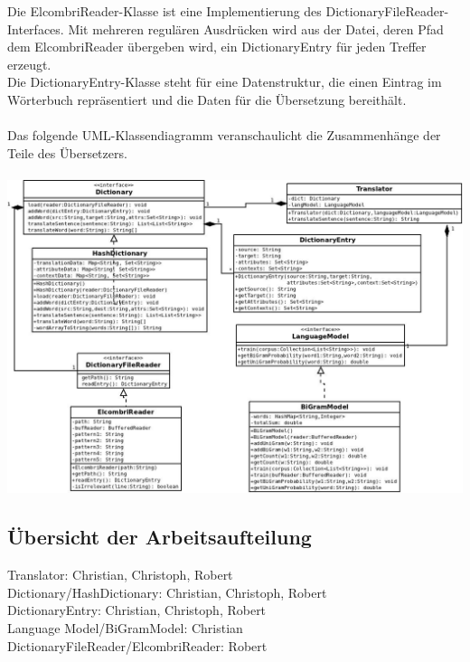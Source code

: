 \documentclass[12pt]{amsart}
\begin{document}
Die ElcombriReader-Klasse ist eine Implementierung des DictionaryFileReader-Interfaces. Mit mehreren regulären Ausdrücken wird aus der Datei, deren Pfad dem ElcombriReader übergeben wird, ein DictionaryEntry für jeden Treffer erzeugt.\\
Die DictionaryEntry-Klasse steht für eine Datenstruktur, die einen Eintrag im Wörterbuch repräsentiert und die Daten für die Übersetzung bereithält.\\
\\
Das folgende UML-Klassendiagramm veranschaulicht die Zusammenhänge der Teile des Übersetzers.\\
\\
\includegraphics[scale=0.6,angle=90]{UML.jpg}

\subsection{Übersicht der Arbeitsaufteilung}
\vspace{\baselineskip}
Translator: Christian, Christoph, Robert\\
Dictionary/HashDictionary: Christian, Christoph, Robert\\
DictionaryEntry: Christian, Christoph, Robert\\
Language Model/BiGramModel: Christian\\
DictionaryFileReader/ElcombriReader: Robert
\end{document}
